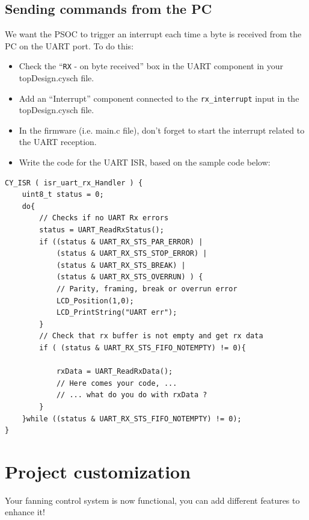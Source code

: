 \documentclass[11pt,a4paper]{article}
\theoremstyle{definition}%
\begin{document}
\subsection{Sending commands from the PC}

We want the PSOC to trigger an interrupt each time a byte is received from the PC on the UART port. To do this:
\begin{itemize}
	\item Check the ``\texttt{RX} - on byte received'' box in the UART component in your topDesign.cysch file.
	\item Add an ``Interrupt'' component connected to the \texttt{rx\_interrupt} input in the topDesign.cysch file.
	\item In the firmware (i.e. main.c file), don't forget to start the interrupt related to the UART reception.
	\item Write the code for the UART ISR, based on the sample code below: 
\end{itemize}


\begin{lstlisting}[style=CStyle]
CY_ISR ( isr_uart_rx_Handler ) {
    uint8_t status = 0;
    do{
        // Checks if no UART Rx errors
        status = UART_ReadRxStatus();
        if ((status & UART_RX_STS_PAR_ERROR) | 
            (status & UART_RX_STS_STOP_ERROR) | 
            (status & UART_RX_STS_BREAK) | 
            (status & UART_RX_STS_OVERRUN) ) {
            // Parity, framing, break or overrun error
            LCD_Position(1,0);
            LCD_PrintString("UART err");
        }
        // Check that rx buffer is not empty and get rx data
        if ( (status & UART_RX_STS_FIFO_NOTEMPTY) != 0){
            
            rxData = UART_ReadRxData();
            // Here comes your code, ...
            // ... what do you do with rxData ? 
        }
    }while ((status & UART_RX_STS_FIFO_NOTEMPTY) != 0);    
}
\end{lstlisting}






\section{Project customization}
Your fanning control system is now functional, you can add different features to enhance it!
\end{document}
